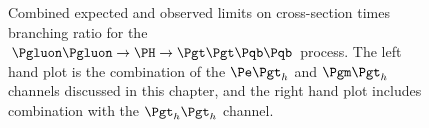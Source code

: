 \begin{figure}
\begin{center}

\end{center}
\caption{
Combined expected and observed limits on cross-section times branching ratio for the
$\Pgluon\Pgluon\to\PH\to\Pgt\Pgt\Pqb\Pqb$ process. The left hand plot is the
combination of the $\etau$ and $\mutau$ channels discussed in this chapter, and
the right hand plot includes combination with the $\tautau$ channel.}
\label{fig:HhhCmblimits}
\end{figure}

